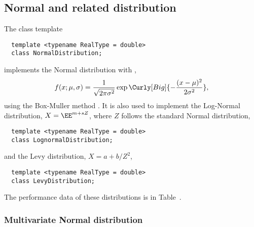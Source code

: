 \subsection{Normal and related distribution}
\label{sub:Normal and related distribuiton}

The class template
\begin{Verbatim}
  template <typename RealType = double>
  class NormalDistribution;
\end{Verbatim}
implements the Normal distribution with \pdf,
\begin{equation*}
  f(x;\mu,\sigma) =
  \frac{1}{\sqrt{2\pi\sigma^2}}\exp\Curly[Big]{-\frac{(x-\mu)^2}{2\sigma^2}},
\end{equation*}
using the Box-Muller method \parencite{Box:1958hv}. It is also used to
implement the Log-Normal distribution, $X = \EE^{m + s Z}$, where $Z$ follows
the standard Normal distribution,
\begin{Verbatim}
  template <typename RealType = double>
  class LognormalDistribution;
\end{Verbatim}
and the Levy distribution, $X = a + b / Z^2$,
\begin{Verbatim}
  template <typename RealType = double>
  class LevyDistribution;
\end{Verbatim}
The performance data of these distributions is in Table~.

\subsubsection{Multivariate Normal distribution}

